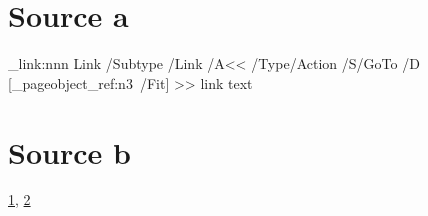 \documentclass{article}
\begin{document}
\section{Source a}\label{a}

\newpage 
\ExplSyntaxOn
\pdfannot_link:nnn { Link }
{
 /Subtype /Link
/A<<
/Type/Action
/S/GoTo
/D [\pdf_pageobject_ref:n{3}~/Fit]
>>
}
{ link text}
\ExplSyntaxOff

\newpage 
\section{Source b}\label{b}

\ref{a}, \ref{b} 
\end{document}
